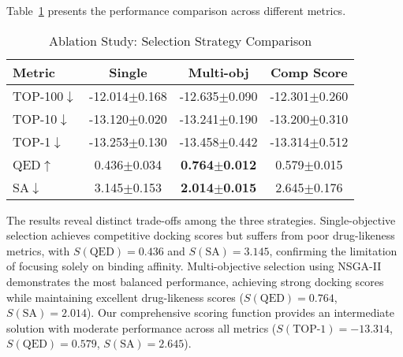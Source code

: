 \documentclass[lettersize,journal]{IEEEtran}
\begin{document}
Table~\ref{tab:selection_ablation} presents the performance comparison across different metrics.

\begin{table}[!t]
    \caption{Ablation Study: Selection Strategy Comparison}
    \label{tab:selection_ablation}
    \centering    
    \small
    \setlength{\tabcolsep}{4pt}
    
    \begin{tabular}{l c c c}
        \hline\hline
        Metric & Single & Multi-obj & Comp Score \\
        \hline
        TOP-100$\downarrow$ & -12.014$\pm$0.168 & -12.635$\pm$0.090 & -12.301$\pm$0.260 \\
        TOP-10$\downarrow$ & -13.120$\pm$0.020 & -13.241$\pm$0.190 & -13.200$\pm$0.310 \\
        TOP-1$\downarrow$ & -13.253$\pm$0.130 & -13.458$\pm$0.442 & -13.314$\pm$0.512 \\
        QED$\uparrow$ & 0.436$\pm$0.034 & \textbf{0.764$\pm$0.012} & 0.579$\pm$0.015 \\
        SA$\downarrow$ & 3.145$\pm$0.153 & \textbf{2.014$\pm$0.015} & 2.645$\pm$0.176 \\
        \hline\hline
    \end{tabular}
\end{table}

The results reveal distinct trade-offs among the three strategies. Single-objective selection achieves competitive docking scores but suffers from poor drug-likeness metrics, with $S(\text{QED}) = 0.436$ and $S(\text{SA}) = 3.145$, confirming the limitation of focusing solely on binding affinity. Multi-objective selection using NSGA-II demonstrates the most balanced performance, achieving strong docking scores while maintaining excellent drug-likeness scores ($S(\text{QED}) = 0.764$, $S(\text{SA}) = 2.014$). Our comprehensive scoring function provides an intermediate solution with moderate performance across all metrics ($S(\text{TOP-1}) = -13.314$, $S(\text{QED}) = 0.579$, $S(\text{SA}) = 2.645$).
\end{document}
